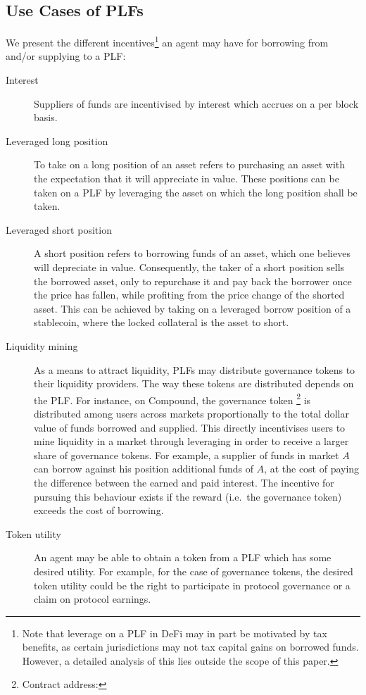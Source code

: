 \subsection{Use Cases of PLFs}
We present the different incentives\footnote{Note that leverage on a PLF in DeFi may in part be motivated by tax benefits, as certain jurisdictions may not tax capital gains on borrowed funds. 
However, a detailed analysis of this lies outside the scope of this paper.} an agent may have for borrowing from and/or supplying to a PLF:
\begin{description}
    \item[Interest] Suppliers of funds are incentivised by interest which accrues on a per block basis.

    \item[Leveraged long position] To take on a long position of an asset refers to purchasing an asset with the expectation that it will appreciate in value. 
    These positions can be taken on a PLF by leveraging the asset on which the long position shall be taken.

    \item[Leveraged short position] A short position refers to borrowing funds of an asset, which one believes will depreciate in value. 
    Consequently, the taker of a short position sells the borrowed asset, only to repurchase it and pay back the borrower once the price has fallen, while profiting from the price change of the shorted asset.
    This can be achieved by taking on a leveraged borrow position of a stablecoin, where the locked collateral is the asset to short.

    \item[Liquidity mining] As a means to attract liquidity, PLFs may distribute governance tokens to their liquidity providers.
    The way these tokens are distributed depends on the PLF. 
    For instance, on Compound, the governance token \footnote{Contract address: } is distributed among users across markets proportionally to the total dollar value of funds borrowed and supplied.
    This directly incentivises users to mine liquidity in a market through leveraging in order to receive a larger share of governance tokens.
    For example, a supplier of funds in market $A$ can borrow against his position additional funds of $A$, at the cost of paying the difference between the earned and paid interest. 
    The incentive for pursuing this behaviour exists if the reward (i.e.\ the governance token) exceeds the cost of borrowing.
    
    \item[Token utility] An agent may be able to obtain a token from a PLF which has some desired utility.
    For example, for the case of governance tokens, the desired token utility could be the right to participate in protocol governance or a claim on protocol earnings.
    
    
\end{description}


